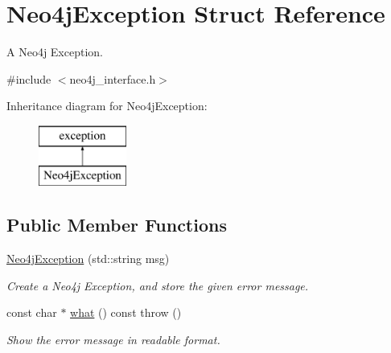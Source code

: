 \hypertarget{structNeo4jException}{\section{Neo4j\-Exception Struct Reference}
\label{structNeo4jException}
}


A Neo4j Exception.  




{\ttfamily \#include $<$neo4j\-\_\-interface.\-h$>$}

Inheritance diagram for Neo4j\-Exception\-:\begin{figure}[H]
\begin{center}
\leavevmode
\includegraphics[height=2.000000cm]{structNeo4jException}
\end{center}
\end{figure}
\subsection*{Public Member Functions}
\begin{DoxyCompactItemize}
\item 
\hypertarget{structNeo4jException_abc88c2de520842b99f79a8df4ce04d59}{\hyperlink{structNeo4jException_abc88c2de520842b99f79a8df4ce04d59}{Neo4j\-Exception} (std\-::string msg)}\label{structNeo4jException_abc88c2de520842b99f79a8df4ce04d59}

\begin{DoxyCompactList}\small\item\em Create a Neo4j Exception, and store the given error message. \end{DoxyCompactList}\item 
\hypertarget{structNeo4jException_a2a366af8251f2aa869e64326f96e108d}{const char $\ast$ \hyperlink{structNeo4jException_a2a366af8251f2aa869e64326f96e108d}{what} () const   throw ()}\label{structNeo4jException_a2a366af8251f2aa869e64326f96e108d}

\begin{DoxyCompactList}\small\item\em Show the error message in readable format. \end{DoxyCompactList}\end{DoxyCompactItemize}
